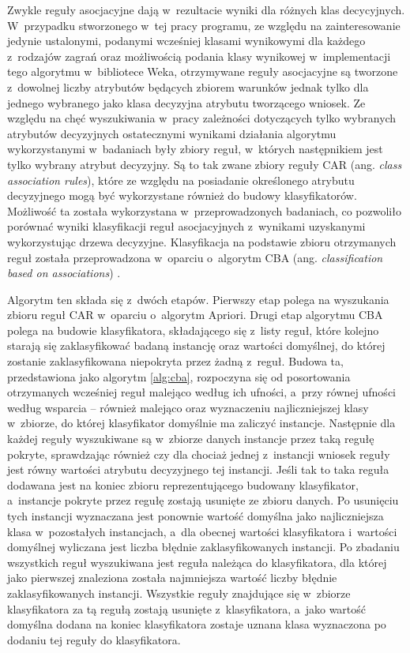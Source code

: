 \documentclass[a4paper,twoside,12pt]{book}
\newcommand{\obcy}[1]{\emph{#1}}
\renewcommand{\ang}[1]{{\selectlanguage{british}\obcy{#1}}}
\begin{document}
Zwykle reguły asocjacyjne dają w~rezultacie wyniki dla różnych klas decycyjnych. W~przypadku stworzonego w~tej pracy programu, ze względu na zainteresowanie jedynie ustalonymi, podanymi wcześniej klasami wynikowymi dla każdego z~rodzajów zagrań oraz możliwością podania klasy wynikowej w~implementacji tego algorytmu w~bibliotece Weka, otrzymywane reguły asocjacyjne są tworzone z~dowolnej liczby atrybutów będących zbiorem warunków jednak tylko dla jednego wybranego jako klasa decyzyjna atrybutu tworzącego wniosek. Ze względu na chęć wyszukiwania w~pracy zależności dotyczących tylko wybranych atrybutów decyzyjnych ostatecznymi wynikami działania algorytmu wykorzystanymi w~badaniach były zbiory reguł, w~których następnikiem jest tylko wybrany atrybut decyzyjny. Są to tak zwane zbiory reguły CAR (ang. \ang{class association rules}), które ze względu na posiadanie określonego atrybutu decyzyjnego mogą być wykorzystane również do budowy klasyfikatorów. Możliwość ta została wykorzystana w~przeprowadzonych badaniach, co pozwoliło porównać wyniki klasyfikacji reguł asocjacyjnych z~wynikami uzyskanymi wykorzystując drzewa decyzyjne. Klasyfikacja na podstawie zbioru otrzymanych reguł została przeprowadzona w~oparciu o~algorytm CBA (ang. \ang{classification based on associations})   \cite{bib:car}.

Algorytm ten składa się z~dwóch etapów. Pierwszy etap polega na wyszukania zbioru reguł CAR w~oparciu o~algorytm Apriori. Drugi etap algorytmu CBA polega na budowie klasyfikatora, składającego się z~listy reguł, które kolejno starają się zaklasyfikować badaną instancję oraz wartości domyślnej, do której zostanie zaklasyfikowana niepokryta przez żadną z~reguł. Budowa ta, przedstawiona jako algorytm \ref{alg:cba}, rozpoczyna się od posortowania otrzymanych wcześniej reguł malejąco według ich ufności, a~przy równej ufności według wsparcia -- również malejąco oraz wyznaczeniu najliczniejszej klasy w~zbiorze, do której klasyfikator domyślnie ma zaliczyć instancje. Następnie dla każdej reguły wyszukiwane są w~zbiorze danych instancje przez taką regułę pokryte, sprawdzając również czy dla chociaż jednej z~instancji wniosek reguły jest równy wartości atrybutu decyzyjnego tej instancji. Jeśli tak to taka reguła dodawana jest na koniec zbioru reprezentującego budowany klasyfikator, a~instancje pokryte przez regułę zostają usunięte ze zbioru danych. Po usunięciu tych instancji wyznaczana jest ponownie wartość domyślna jako najliczniejsza klasa w~pozostałych instancjach, a~dla obecnej wartości klasyfikatora i~wartości domyślnej wyliczana jest liczba błędnie zaklasyfikowanych instancji. Po zbadaniu wszystkich reguł wyszukiwana jest reguła należąca do klasyfikatora, dla której jako pierwszej znaleziona została najmniejsza wartość liczby błędnie zaklasyfikowanych instancji. Wszystkie reguły znajdujące się w~zbiorze klasyfikatora za tą regułą zostają usunięte z~klasyfikatora, a~jako wartość domyślna dodana na koniec klasyfikatora zostaje uznana klasa wyznaczona po dodaniu tej reguły do klasyfikatora.
\end{document}
